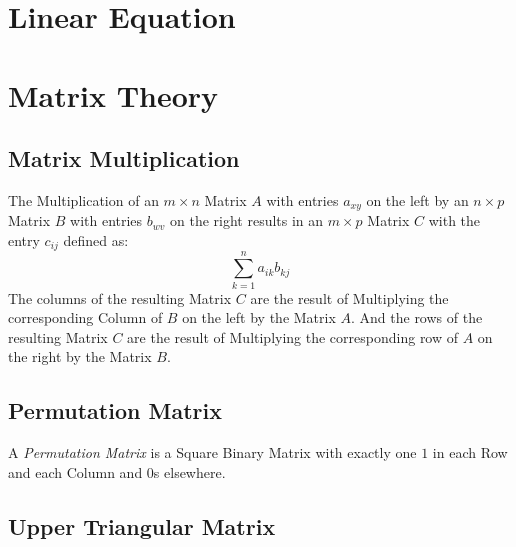 \section{Linear Equation}\label{sec:linear_equation}

\section{Matrix Theory}\label{sec:matrix_theory}

\subsection{Matrix Multiplication}\label{sec:matrix_multiplication}

The Multiplication of an $m \times n$ Matrix $A$ with entries $a_{xy}$
on the left by an $n \times p$ Matrix $B$ with entries $b_{wv}$ on the
right results in an $m \times p$ Matrix $C$ with the entry $c_{ij}$
defined as:
\[
  \sum_{k=1}^n a_{ik} b_{kj}
\]
The columns of the resulting Matrix $C$ are the result of Multiplying
the corresponding Column of $B$ on the left by the Matrix $A$. And the
rows of the resulting Matrix $C$ are the result of Multiplying the
corresponding row of $A$ on the right by the Matrix $B$.



\subsection{Permutation Matrix}\label{sec:permutation_matrix}

A \emph{Permutation Matrix} is a Square Binary Matrix with exactly one
$1$ in each Row and each Column and $0$s elsewhere.



\subsection{Upper Triangular Matrix}\label{sec:upper_triangular}

